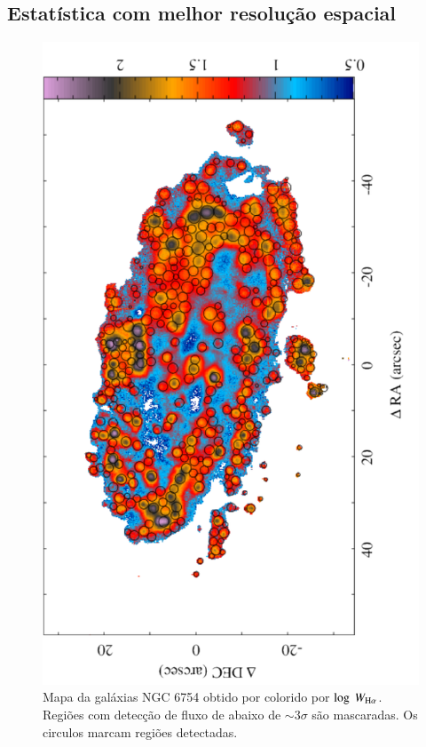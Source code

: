 \subsection{Estatística com melhor resolução espacial}
\label{sec:concl:futIFS:MUSE}
\begin{figure}
 \includegraphics[scale=0.5,angle=-90]{figuras/map_EW_Ha_HII.pdf}
 \caption[MUSE: Mapa de $W_{{\rm H}\alpha}$ da galáxia NGC 6754]
 {Mapa da galáxias NGC 6754 obtido por \citet{Sanchez.etal.2015MUSE} colorido por $\log\ W_{\Ha}$. Regiões com detecção de fluxo de \Ha abaixo de $\sim 3\sigma$ são mascaradas. Os circulos marcam regiões \hii detectadas.}
 \label{fig:WHaSebasMUSE}
\end{figure}

